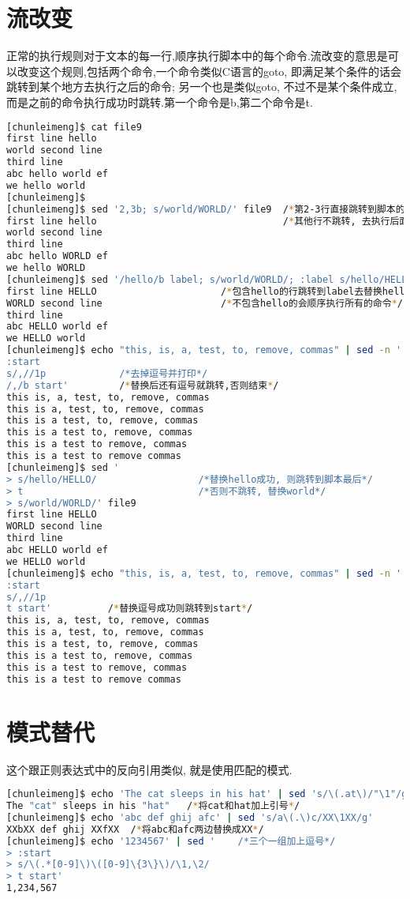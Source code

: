 \documentclass{article}
\begin{document}
\section{流改变}
正常的执行规则对于文本的每一行,顺序执行脚本中的每个命令.流改变的意思是可以改变这个规则,包括两个命令,一个命令类似C语言的goto, 即满足某个条件的话会跳转到某个地方去执行之后的命令; 另一个也是类似goto, 不过不是某个条件成立, 而是之前的命令执行成功时跳转.第一个命令是b,第二个命令是t. \par
\begin{lstlisting}[language=bash, caption={Stream Change-b}]
[chunleimeng]$ cat file9
first line hello
world second line
third line
abc hello world ef
we hello world
[chunleimeng]$ 
[chunleimeng]$ sed '2,3b; s/world/WORLD/' file9  /*第2-3行直接跳转到脚本的最后*/
first line hello                                 /*其他行不跳转, 去执行后面的替换命令*/
world second line
third line
abc hello WORLD ef
we hello WORLD
[chunleimeng]$ sed '/hello/b label; s/world/WORLD/; :label s/hello/HELLO/' file9
first line HELLO                      /*包含hello的行跳转到label去替换hello*/
WORLD second line                     /*不包含hello的会顺序执行所有的命令*/
third line
abc HELLO world ef
we HELLO world
[chunleimeng]$ echo "this, is, a, test, to, remove, commas" | sed -n '
:start
s/,//1p             /*去掉逗号并打印*/
/,/b start'         /*替换后还有逗号就跳转,否则结束*/
this is, a, test, to, remove, commas
this is a, test, to, remove, commas
this is a test, to, remove, commas
this is a test to, remove, commas
this is a test to remove, commas
this is a test to remove commas 
[chunleimeng]$ sed '
> s/hello/HELLO/                  /*替换hello成功, 则跳转到脚本最后*/
> t                               /*否则不跳转, 替换world*/
> s/world/WORLD/' file9
first line HELLO
WORLD second line
third line
abc HELLO world ef
we HELLO world
[chunleimeng]$ echo "this, is, a, test, to, remove, commas" | sed -n '
:start
s/,//1p
t start'          /*替换逗号成功则跳转到start*/
this is, a, test, to, remove, commas
this is a, test, to, remove, commas
this is a test, to, remove, commas
this is a test to, remove, commas
this is a test to remove, commas
this is a test to remove commas
\end{lstlisting}

\section{模式替代}
这个跟正则表达式中的反向引用类似, 就是使用匹配的模式. \par
\begin{lstlisting}[language=bash, caption={Stream Change-b}]
[chunleimeng]$ echo 'The cat sleeps in his hat' | sed 's/\(.at\)/"\1"/g'
The "cat" sleeps in his "hat"   /*将cat和hat加上引号*/
[chunleimeng]$ echo 'abc def ghij afc' | sed 's/a\(.\)c/XX\1XX/g'
XXbXX def ghij XXfXX  /*将abc和afc两边替换成XX*/
[chunleimeng]$ echo '1234567' | sed '    /*三个一组加上逗号*/
> :start
> s/\(.*[0-9]\)\([0-9]\{3\}\)/\1,\2/
> t start'
1,234,567
\end{lstlisting}
\end{document}
